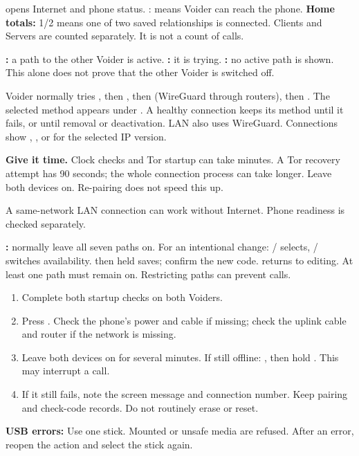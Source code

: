 \textbf{} opens Internet and phone status. :  means Voider can reach the phone.
\textbf{Home totals:} 1/2 means one of two saved relationships is connected. Clients and Servers are counted separately. It is not a count of calls.

\textbf{:} a path to the other Voider is active. \textbf{:} it is trying. \textbf{:} no active path is shown. This alone does not prove that the other Voider is switched off.

Voider normally tries , then , then  (WireGuard through routers), then . The selected method appears under . A healthy connection keeps its method until it fails, or until removal or deactivation. LAN also uses WireGuard. Connections show , ,  or  for the selected IP version.

\textbf{Give it time.} Clock checks and Tor startup can take minutes. A Tor recovery attempt has 90 seconds; the whole connection process can take longer. Leave both devices on. Re-pairing does not speed this up.

A same-network LAN connection can work without Internet. Phone readiness is checked separately.

\textbf{:} normally leave all seven paths on. For an intentional change: / selects, / switches availability.  then held  saves; confirm the new code.  returns to editing. At least one path must remain on. Restricting paths can prevent calls.

\begin{enumerate}
\item Complete both startup checks on both Voiders.
\item Press . Check the phone's power and cable if missing; check the uplink cable and router if the network is missing.
\item Leave both devices on for several minutes. If still offline:  \arr {}, then hold . This may interrupt a call.
\item If it still fails, note the screen message and connection number. Keep pairing and check-code records. Do not routinely erase or reset.
\end{enumerate}
\textbf{USB errors:} Use one stick. Mounted or unsafe media are refused. After an error, reopen the action and select the stick again.

